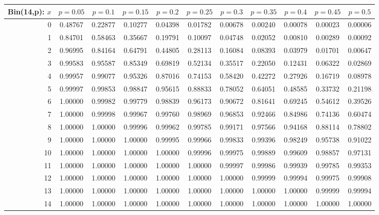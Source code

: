 \documentclass{article}
\begin{document}
{\vspace{8pt minus 6pt}
\begin{tabular}{@{\extracolsep{-2pt}}|r|c|c|c|c|c|c|c|c|c|c|}
\hline
Bin(14,p): $x$
   & $p\!=\!0.05$& $p\!=\!0.1$& $p\!=\!0.15$& $p\!=\!0.2$& $p\!=\!0.25$& $p\!=\!0.3$& $p\!=\!0.35$& $p\!=\!0.4$& $p\!=\!0.45$& $p\!=\!0.5$\\\hline
  0&0.48767&0.22877&0.10277&0.04398&0.01782&0.00678&0.00240&0.00078&0.00023&0.00006\\
  1&0.84701&0.58463&0.35667&0.19791&0.10097&0.04748&0.02052&0.00810&0.00289&0.00092\\
  2&0.96995&0.84164&0.64791&0.44805&0.28113&0.16084&0.08393&0.03979&0.01701&0.00647\\
  3&0.99583&0.95587&0.85349&0.69819&0.52134&0.35517&0.22050&0.12431&0.06322&0.02869\\
  4&0.99957&0.99077&0.95326&0.87016&0.74153&0.58420&0.42272&0.27926&0.16719&0.08978\\
  5&0.99997&0.99853&0.98847&0.95615&0.88833&0.78052&0.64051&0.48585&0.33732&0.21198\\
  6&1.00000&0.99982&0.99779&0.98839&0.96173&0.90672&0.81641&0.69245&0.54612&0.39526\\
  7&1.00000&0.99998&0.99967&0.99760&0.98969&0.96853&0.92466&0.84986&0.74136&0.60474\\
  8&1.00000&1.00000&0.99996&0.99962&0.99785&0.99171&0.97566&0.94168&0.88114&0.78802\\
  9&1.00000&1.00000&1.00000&0.99995&0.99966&0.99833&0.99396&0.98249&0.95738&0.91022\\
 10&1.00000&1.00000&1.00000&1.00000&0.99996&0.99975&0.99889&0.99609&0.98857&0.97131\\
 11&1.00000&1.00000&1.00000&1.00000&1.00000&0.99997&0.99986&0.99939&0.99785&0.99353\\
 12&1.00000&1.00000&1.00000&1.00000&1.00000&1.00000&0.99999&0.99994&0.99975&0.99908\\
 13&1.00000&1.00000&1.00000&1.00000&1.00000&1.00000&1.00000&1.00000&0.99999&0.99994\\
 14&1.00000&1.00000&1.00000&1.00000&1.00000&1.00000&1.00000&1.00000&1.00000&1.00000\\
\hline
\end{tabular}

}
\end{document}
